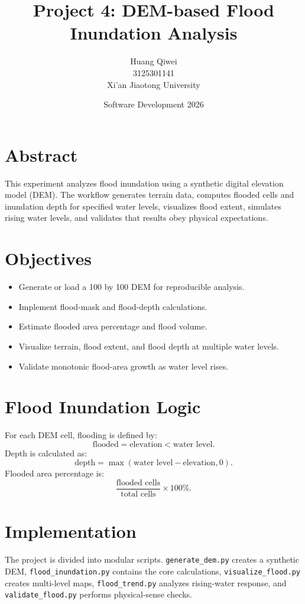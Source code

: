 \documentclass[11pt]{article}
\title{Project 4: DEM-based Flood Inundation Analysis}
\author{Huang Qiwei \\ 3125301141 \\ Xi'an Jiaotong University}
\date{Software Development 2026}
\begin{document}
\maketitle

\section*{Abstract}
This experiment analyzes flood inundation using a synthetic digital elevation model (DEM). The workflow generates terrain data, computes flooded cells and inundation depth for specified water levels, visualizes flood extent, simulates rising water levels, and validates that results obey physical expectations.

\section*{Objectives}
\begin{itemize}
  \item Generate or load a 100 by 100 DEM for reproducible analysis.
  \item Implement flood-mask and flood-depth calculations.
  \item Estimate flooded area percentage and flood volume.
  \item Visualize terrain, flood extent, and flood depth at multiple water levels.
  \item Validate monotonic flood-area growth as water level rises.
\end{itemize}

\section*{Flood Inundation Logic}
For each DEM cell, flooding is defined by:
\[
\text{flooded} = \text{elevation} < \text{water level}.
\]
Depth is calculated as:
\[
\text{depth} = \max(\text{water level} - \text{elevation}, 0).
\]
Flooded area percentage is:
\[
\frac{\text{flooded cells}}{\text{total cells}} \times 100\%.
\]

\section*{Implementation}
The project is divided into modular scripts. \texttt{generate\_dem.py} creates a synthetic DEM, \texttt{flood\_inundation.py} contains the core calculations, \texttt{visualize\_flood.py} creates multi-level maps, \texttt{flood\_trend.py} analyzes rising-water response, and \texttt{validate\_flood.py} performs physical-sense checks.
\end{document}
